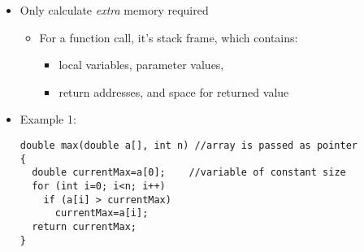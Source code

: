   \begin{itemize}
  \item Only calculate \emph{extra} memory required
    \begin{itemize}
    \item For a function call, it's stack frame, which contains:
      \begin{itemize}
      \item local variables, parameter values,
      \item return addresses, and space for returned value
      \end{itemize}
    \end{itemize}
  \item Example 1:
\begin{lstlisting}
double max(double a[], int n) //array is passed as pointer
{
  double currentMax=a[0];    //variable of constant size
  for (int i=0; i<n; i++)
    if (a[i] > currentMax)
      currentMax=a[i];
  return currentMax;
}
\end{lstlisting}
  \end{itemize}

